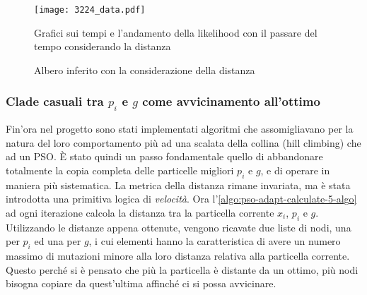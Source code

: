 \begin{figure}[!h]
  \centering
  \texttt{[image: 3224\_data.pdf]}
  \caption{Grafici sui tempi e l'andamento della likelihood con il passare del tempo considerando la distanza}
  \label{fig:pso-adapt-calculate-4-data}
\end{figure}

\begin{figure}[!h]
  \centering
  \caption{Albero inferito con la considerazione della distanza}
  \label{fig:pso-adapt-calculate-4-tree}
\end{figure}
\subsubsection{Clade casuali tra $p_i$ e $g$ come avvicinamento all'ottimo}
\label{chap:pso-adapt-calculate-5}
Fin'ora nel progetto sono stati implementati algoritmi che assomigliavano per la natura del loro comportamento più ad una scalata della collina (hill climbing) che ad un PSO. È stato quindi un passo fondamentale quello di abbandonare totalmente la copia completa delle particelle migliori $p_i$ e $g$, e di operare in maniera più sistematica.
La metrica della distanza rimane invariata, ma è stata introdotta una primitiva logica di \textit{velocità}. Ora l'\autoref{algo:pso-adapt-calculate-5-algo} ad ogni iterazione calcola la distanza tra la particella corrente $x_i$, $p_i$ e $g$. Utilizzando le distanze appena ottenute, vengono ricavate due liste di nodi, una per $p_i$ ed una per $g$, i cui elementi hanno la caratteristica di avere un numero massimo di mutazioni minore alla loro distanza relativa alla particella corrente. Questo perché si è pensato che più la particella è distante da un ottimo, più nodi bisogna copiare da quest'ultima affinché ci si possa avvicinare.

